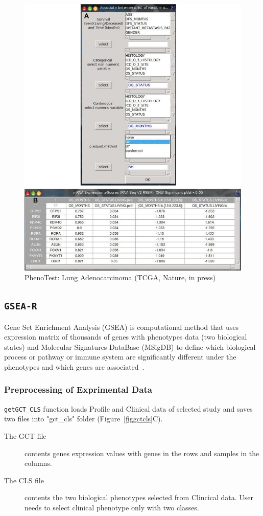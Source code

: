 \documentclass[a4paper]{article}
\begin{document}
\begin{figure}[!ht]
 \centering
\includegraphics[scale= 0.7]{image/LungNatureResults.png}
\caption{PhenoTest: Lung Adenocarcinoma (TCGA, Nature, in press)}
\label{PhenoTestLaungNature}
\end{figure}

\newpage
\subsection{\texttt{GSEA-R}}
Gene Set Enrichment Analysis (GSEA) is computational method that uses expression matrix of thousands of genes with phenotypes data (two biological states) and Molecular Signatures DataBase (MSigDB) to define which biological process or pathway or immune system are significantly different under the phenotypes and which genes are associated~\cite{Subramanian2005}. 
\subsubsection{Preprocessing of Exprimental Data}
\texttt{getGCT\_CLS} function loads Profile and Clinical data  of selected study and saves two files into "gct\_cls" folder (Figure~\ref{figgctcls}C).
\begin{description}
    \item[The GCT file] contents genes expression values with genes in the rows and samples in the columns.
    \item[The CLS file] contents the two biological phenotypes selected from Clincical data. User needs to select clinical phenotype only with two classes.

\end{description}
\end{document}
